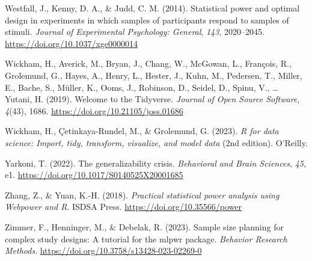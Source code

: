 \documentclass[
  man,
  floatsintext,
  longtable,
  a4paper,
  nolmodern,
  notxfonts,
  notimes,
  colorlinks=true,linkcolor=blue,citecolor=blue,urlcolor=blue]{apa7}
\newlength{\cslhangindent}
\newenvironment{CSLReferences}[2] %
 {\begin{list}{}{%
  \setlength{\itemindent}{0pt}
  \setlength{\leftmargin}{0pt}
  \setlength{\parsep}{0pt}
  \ifodd #1
   \setlength{\leftmargin}{\cslhangindent}
   \setlength{\itemindent}{-1\cslhangindent}
  \fi
  \setlength{\itemsep}{#2\baselineskip}}}
 {\end{list}}
\begin{document}
\begin{CSLReferences}{1}{0}
Westfall, J., Kenny, D. A., \& Judd, C. M. (2014). Statistical power and
optimal design in experiments in which samples of participants respond
to samples of stimuli. \emph{Journal of Experimental Psychology:
General}, \emph{143}, 2020--2045.
\url{https://doi.org/10.1037/xge0000014}

Wickham, H., Averick, M., Bryan, J., Chang, W., McGowan, L., François,
R., Grolemund, G., Hayes, A., Henry, L., Hester, J., Kuhn, M., Pedersen,
T., Miller, E., Bache, S., Müller, K., Ooms, J., Robinson, D., Seidel,
D., Spinu, V., \ldots{} Yutani, H. (2019). Welcome to the {Tidyverse}.
\emph{Journal of Open Source Software}, \emph{4}(43), 1686.
\url{https://doi.org/10.21105/joss.01686}

Wickham, H., Çetinkaya-Rundel, M., \& Grolemund, G. (2023). \emph{R for
data science: Import, tidy, transform, visualize, and model data} (2nd
edition). O'Reilly.

Yarkoni, T. (2022). The generalizability crisis. \emph{Behavioral and
Brain Sciences}, \emph{45}, e1.
\url{https://doi.org/10.1017/S0140525X20001685}

Zhang, Z., \& Yuan, K.-H. (2018). \emph{Practical statistical power
analysis using {Webpower} and {R}}. ISDSA Press.
\url{https://doi.org/10.35566/power}

Zimmer, F., Henninger, M., \& Debelak, R. (2023). Sample size planning
for complex study designs: {A} tutorial for the mlpwr package.
\emph{Behavior Research Methods}.
\url{https://doi.org/10.3758/s13428-023-02269-0}

\end{CSLReferences}
\end{document}
